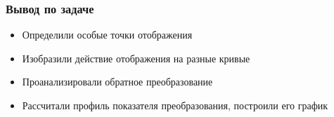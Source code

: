 \begin{frame}\frametitle{Вывод по задаче}
  \begin{itemize}
    \item Определили особые точки отображения
    \item Изобразили действие отображения на разные кривые
    \item Проанализировали обратное преобразование
    \item Рассчитали профиль показателя преобразования,
      построили его график
  \end{itemize}
\end{frame}

